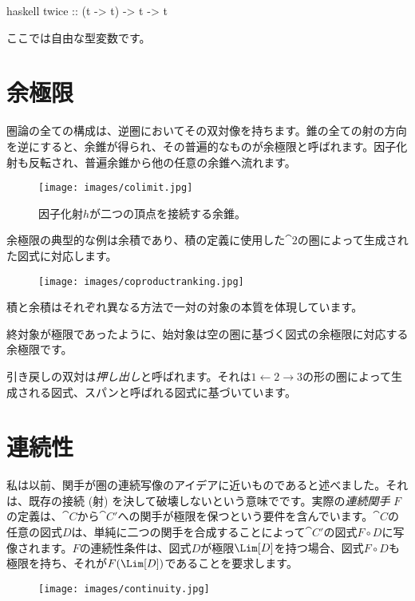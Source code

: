 \begin{snip}{haskell}
twice :: (t -> t) -> t -> t
\end{snip}
ここでは自由な型変数です。

\section{余極限}

圏論の全ての構成は、逆圏においてその双対像を持ちます。錐の全ての射の方向を逆にすると、余錐が得られ、その普遍的なものが余極限と呼ばれます。因子化射も反転され、普遍余錐から他の任意の余錐へ流れます。

\begin{figure}[H]
  \centering
  \texttt{[image: images/colimit.jpg]}
  \caption{因子化射$h$が二つの頂点を接続する余錐。}
\end{figure}

\noindent
余極限の典型的な例は余積であり、積の定義に使用した$\cat{2}$の圏によって生成された図式に対応します。

\begin{figure}[H]
  \centering
  \texttt{[image: images/coproductranking.jpg]}
\end{figure}

\noindent
積と余積はそれぞれ異なる方法で一対の対象の本質を体現しています。

終対象が極限であったように、始対象は空の圏に基づく図式の余極限に対応する余極限です。

引き戻しの双対は\emph{押し出し}と呼ばれます。それは$1\leftarrow2\rightarrow3$の形の圏によって生成される図式、スパンと呼ばれる図式に基づいています。

\section{連続性}

私は以前、関手が圏の連続写像のアイデアに近いものであると述べました。それは、既存の接続 (射) を決して破壊しないという意味でです。実際の\emph{連続関手} $F$の定義は、$\cat{C}$から$\cat{C'}$への関手が極限を保つという要件を含んでいます。$\cat{C}$の任意の図式$D$は、単純に二つの関手を合成することによって$\cat{C'}$の図式$F \circ D$に写像されます。$F$の連続性条件は、図式$D$が極限$\Lim[D]$を持つ場合、図式$F \circ D$も極限を持ち、それが$F (\Lim[D])$であることを要求します。

\begin{figure}[H]
  \centering
  \texttt{[image: images/continuity.jpg]}
\end{figure}

